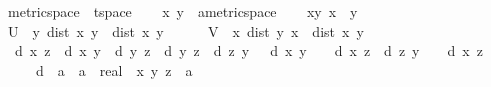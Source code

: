 \begin{isabellebody}
\isamarkupfalse%
%
\endisatagproof
{\isafoldproof}%
%
\isadelimproof
\isanewline
%
\endisadelimproof
\isanewline
{}\isamarkupfalse%
\isanewline
\isanewline
{}\isamarkupfalse%
\ metric{\isacharunderscore}{\kern0pt}space\ {\isasymsubseteq}\ t{}{\isacharunderscore}{\kern0pt}space\isanewline
%
\isadelimproof
%
\endisadelimproof
%
\isatagproof
{}\isamarkupfalse%
\isanewline
\ \ \isamarkupfalse%
\ x\ y\ {\isacharcolon}{\kern0pt}{\isacharcolon}{\kern0pt}\ {\isachardoublequoteopen}{\isacharprime}{\kern0pt}a{\isacharcolon}{\kern0pt}{\isacharcolon}{\kern0pt}metric{\isacharunderscore}{\kern0pt}space{\isachardoublequoteclose}\isanewline
\ \ \isamarkupfalse%
\ xy{\isacharcolon}{\kern0pt}\ {\isachardoublequoteopen}x\ {\isasymnoteq}\ y{\isachardoublequoteclose}\isanewline
\ \ \isamarkupfalse%
\ {\isacharquery}{\kern0pt}U\ {\isacharequal}{\kern0pt}\ {\isachardoublequoteopen}{\isacharbraceleft}{\kern0pt}y{\isacharprime}{\kern0pt}{\isachardot}{\kern0pt}\ dist\ x\ y{\isacharprime}{\kern0pt}\ {\isacharless}{\kern0pt}\ dist\ x\ y\ {\isacharslash}{\kern0pt}\ {}{\isacharbraceright}{\kern0pt}{\isachardoublequoteclose}\isanewline
\ \ \isamarkupfalse%
\ {\isacharquery}{\kern0pt}V\ {\isacharequal}{\kern0pt}\ {\isachardoublequoteopen}{\isacharbraceleft}{\kern0pt}x{\isacharprime}{\kern0pt}{\isachardot}{\kern0pt}\ dist\ y\ x{\isacharprime}{\kern0pt}\ {\isacharless}{\kern0pt}\ dist\ x\ y\ {\isacharslash}{\kern0pt}\ {}{\isacharbraceright}{\kern0pt}{\isachardoublequoteclose}\isanewline
\ \ \isamarkupfalse%
\ {\isacharasterisk}{\kern0pt}{\isacharcolon}{\kern0pt}\ {\isachardoublequoteopen}d\ x\ z\ {\isasymle}\ d\ x\ y\ {\isacharplus}{\kern0pt}\ d\ y\ z\ {\isasymLongrightarrow}\ d\ y\ z\ {\isacharequal}{\kern0pt}\ d\ z\ y\ {\isasymLongrightarrow}\ {\isasymnot}\ {\isacharparenleft}{\kern0pt}d\ x\ y\ {\isacharasterisk}{\kern0pt}\ {}\ {\isacharless}{\kern0pt}\ d\ x\ z\ {\isasymand}\ d\ z\ y\ {\isacharasterisk}{\kern0pt}\ {}\ {\isacharless}{\kern0pt}\ d\ x\ z{\isacharparenright}{\kern0pt}{\isachardoublequoteclose}\isanewline
\ \ \ \ \ d\ {\isacharcolon}{\kern0pt}{\isacharcolon}{\kern0pt}\ {\isachardoublequoteopen}{\isacharprime}{\kern0pt}a\ {\isasymRightarrow}\ {\isacharprime}{\kern0pt}a\ {\isasymRightarrow}\ real{\isachardoublequoteclose}\ \ x\ y\ z\ {\isacharcolon}{\kern0pt}{\isacharcolon}{\kern0pt}\ {\isacharprime}{\kern0pt}a\isanewline
\ \ \ \ \isamarkupfalse%

\end{isabellebody}
